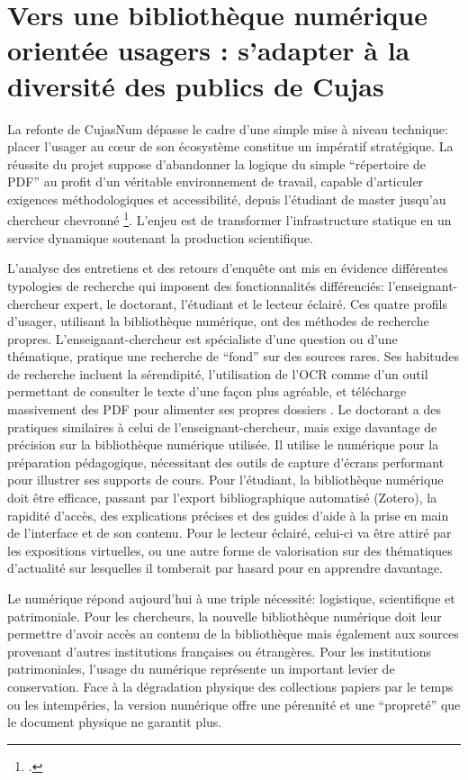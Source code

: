 \section[Diversité des publics]{Vers une bibliothèque numérique orientée usagers : s'adapter à la diversité des publics de Cujas}

La refonte de CujasNum dépasse le cadre d'une simple mise à niveau technique: placer l'usager au cœur de son écosystème constitue un impératif stratégique. La réussite du projet suppose d'abandonner la logique du simple \enquote{répertoire de \ac{PDF}} au profit d'un véritable environnement de travail, capable d'articuler exigences méthodologiques et accessibilité, depuis l'étudiant de master jusqu'au chercheur chevronné \footcite{leblancBibliothequesNumeriquesEnrichies}. L'enjeu est de transformer l'infrastructure statique en un service dynamique soutenant la production scientifique.

L'analyse des entretiens et des retours d'enquête ont mis en évidence différentes typologies de recherche qui imposent des fonctionnalités différenciés: l'enseignant-chercheur expert, le doctorant, l'étudiant et le lecteur éclairé. Ces quatre profils d'usager, utilisant la bibliothèque numérique, ont des méthodes de recherche propres. L'enseignant-chercheur est spécialiste d'une question ou d'une thématique, pratique une recherche de \enquote{fond} sur des sources rares. Ses habitudes de recherche incluent la sérendipité, l'utilisation de l'\ac{OCR} comme d'un outil permettant de consulter le texte d'une façon plus agréable, et télécharge massivement des \ac{PDF} pour alimenter ses propres dossiers . Le doctorant a des pratiques similaires à celui de l'enseignant-chercheur, mais exige davantage de précision sur la bibliothèque numérique utilisée. Il utilise le numérique pour la préparation pédagogique, nécessitant des outils de capture d'écrans performant pour illustrer ses supports de cours. Pour l'étudiant, la bibliothèque numérique doit être efficace, passant par l'export bibliographique automatisé (Zotero), la rapidité d'accès, des explications précises et des guides d'aide à la prise en main de l'interface et de son contenu. Pour le lecteur éclairé, celui-ci va être attiré par les expositions virtuelles, ou une autre forme de valorisation sur des thématiques d'actualité sur lesquelles il tomberait par hasard pour en apprendre davantage.

Le numérique répond aujourd'hui à une triple nécessité: logistique, scientifique et patrimoniale. Pour les chercheurs, la nouvelle bibliothèque numérique doit leur permettre d'avoir accès au contenu de la bibliothèque mais également aux sources provenant d'autres institutions françaises ou étrangères. Pour les institutions patrimoniales, l'usage du numérique représente un important levier de conservation. Face à la dégradation physique des collections papiers par le temps ou les intempéries, la version numérique offre une pérennité et une \enquote{propreté} que le document physique ne garantit plus. 
 
